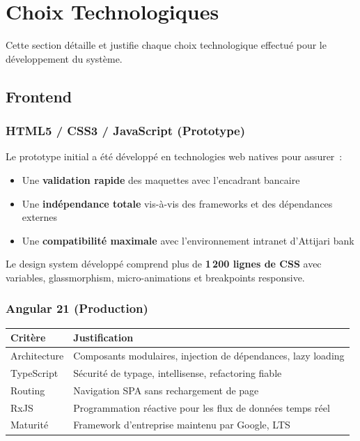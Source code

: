 \documentclass[12pt,a4paper]{report}
\begin{document}
\chapter{Choix Technologiques}

Cette section détaille et justifie chaque choix technologique effectué pour le développement du système.

\section{Frontend}

\subsection{HTML5 / CSS3 / JavaScript (Prototype)}

Le prototype initial a été développé en technologies web natives pour assurer~:
\begin{itemize}[noitemsep]
    \item Une \textbf{validation rapide} des maquettes avec l'encadrant bancaire
    \item Une \textbf{indépendance totale} vis-à-vis des frameworks et des dépendances externes
    \item Une \textbf{compatibilité maximale} avec l'environnement intranet d'Attijari bank
\end{itemize}

Le design system développé comprend plus de \textbf{1\,200 lignes de CSS} avec variables, glassmorphism, micro-animations et breakpoints responsive.

\subsection{Angular 21 (Production)}

\begin{table}[H]
\centering
\begin{tabularx}{\textwidth}{|l|X|}
\hline
\textbf{Critère} & \textbf{Justification} \\
\hline
Architecture & Composants modulaires, injection de dépendances, lazy loading \\
\hline
TypeScript & Sécurité de typage, intellisense, refactoring fiable \\
\hline
Routing & Navigation SPA sans rechargement de page \\
\hline
RxJS & Programmation réactive pour les flux de données temps réel \\
\hline
Maturité & Framework d'entreprise maintenu par Google, LTS \\
\hline
\end{tabularx}
\end{table}
\end{document}
